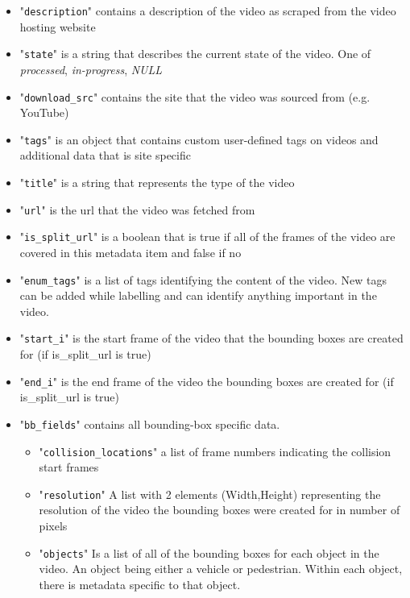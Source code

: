 \documentclass[letterpaper, 10 pt, conference]{IEEEconf}
\begin{document}
\begin{itemize}
  \item "\texttt{description}" contains a description of the video as scraped from the video hosting website
  \item "\texttt{state}" is a string that describes the current state of the video. One of \textit{processed}, \textit{in-progress}, \textit{NULL}
  \item "\texttt{download\_src}" contains the site that the video was sourced from (e.g. YouTube)
  \item "\texttt{tags}" is an object that contains custom user-defined tags on videos and additional data that is site specific
  \item "\texttt{title}" is a string that represents the type of the video
  \item "\texttt{url}" is the url that the video was fetched from
  \item "\texttt{is\_split\_url}" is a boolean that is true if all of the frames of the video are covered in this metadata item and false if no
  \item "\texttt{enum\_tags}" is a list of tags identifying the content of the video. New tags can be added while labelling and can identify anything important in the video.
  \item "\texttt{start\_i}" is the start frame of the video that the bounding boxes are created for (if is\_split\_url is true)
  \item "\texttt{end\_i}" is the end frame of the video the bounding boxes are created for (if is\_split\_url is true)
  \item "\texttt{bb\_fields}" contains all bounding-box specific data.
  \begin{itemize}
    \item "\texttt{collision\_locations}" a list of frame numbers indicating the collision start frames
    \item "\texttt{resolution}" A list with 2 elements (Width,Height) representing the resolution of the video the bounding boxes were created for in number of pixels 
    \item "\texttt{objects}" Is a list of all of the bounding boxes for each object in the video. An object being either a vehicle or pedestrian. Within each object, there is metadata specific to that object.
    \begin{itemize}

\end{itemize}
\end{itemize}
\end{itemize}
\end{document}
